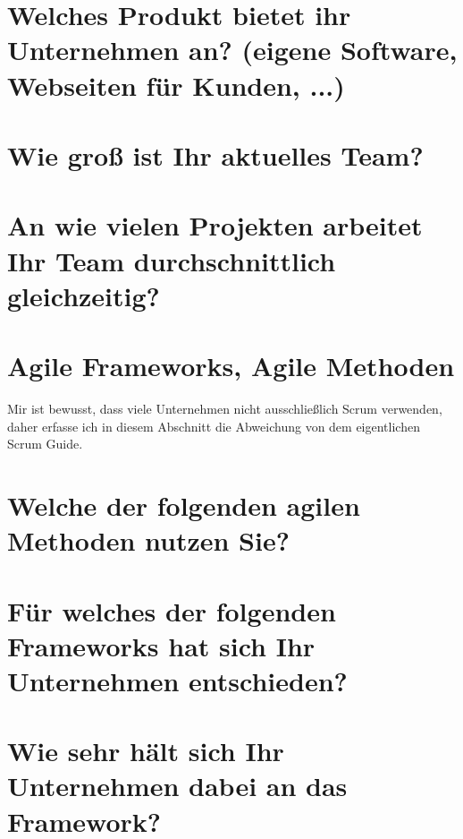 \section*{Welches Produkt bietet ihr Unternehmen an? (eigene Software, Webseiten für Kunden, ...)}
\kurzantwort

\section*{Wie groß ist Ihr aktuelles Team?}
\kurzantwort

\section*{An wie vielen Projekten arbeitet Ihr Team durchschnittlich gleichzeitig?}
\kurzantwort

\section*{Agile Frameworks, Agile Methoden}
Mir ist bewusst, dass viele Unternehmen nicht ausschließlich Scrum verwenden, daher erfasse ich in diesem Abschnitt die Abweichung von dem eigentlichen Scrum Guide.

\section*{Welche der folgenden agilen Methoden nutzen Sie?}

\section*{Für welches der folgenden Frameworks hat sich Ihr Unternehmen entschieden?}

\section*{Wie sehr hält sich Ihr Unternehmen dabei an das Framework?}


